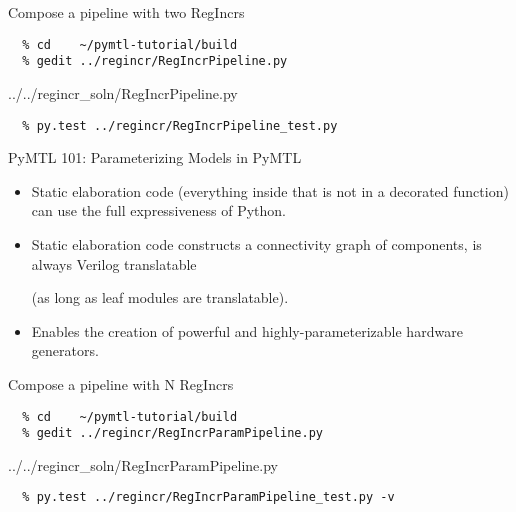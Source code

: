 \begin{task}\begin{frame}[fragile]{Compose a pipeline with two RegIncrs}
\vspace{-0.25in}
\begin{verbatim}
  % cd    ~/pymtl-tutorial/build
  % gedit ../regincr/RegIncrPipeline.py
\end{verbatim}

\vspace{-0.3in}
%
{../../regincr_soln/RegIncrPipeline.py}

\vspace{-0.3in}
\begin{verbatim}
  % py.test ../regincr/RegIncrPipeline_test.py
\end{verbatim}
\end{frame}
\end{task}

\begin{frame}{PyMTL 101: Parameterizing Models in PyMTL}
\begin{itemize}
  \item Static elaboration code (everything inside  that
        is not in a decorated function) can use the full expressiveness of
        Python.
  \smallskip
  \item Static elaboration code constructs a connectivity graph of
        components, is always Verilog translatable

        (as long as leaf modules are translatable).
  \smallskip
  \item Enables the creation of powerful and highly-parameterizable
        hardware generators.
\end{itemize}
\end{frame}

\begin{task}\begin{frame}[fragile]{Compose a pipeline with N RegIncrs}
\vspace{-0.25in}
\begin{verbatim}
  % cd    ~/pymtl-tutorial/build
  % gedit ../regincr/RegIncrParamPipeline.py
\end{verbatim}

\vspace{-0.3in}
%
{../../regincr_soln/RegIncrParamPipeline.py}

\vspace{-0.3in}
\begin{verbatim}
  % py.test ../regincr/RegIncrParamPipeline_test.py -v
\end{verbatim}
\end{frame}
\end{task}

